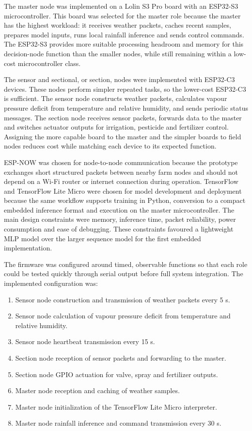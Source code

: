 \documentclass[12pt,a4paper]{report}
\begin{document}
The master node was implemented on a Lolin S3 Pro board with an ESP32-S3 microcontroller. This board was selected for the master role because the master has the highest workload: it receives weather packets, caches recent samples, prepares model inputs, runs local rainfall inference and sends control commands. The ESP32-S3 provides more suitable processing headroom and memory for this decision-node function than the smaller nodes, while still remaining within a low-cost microcontroller class.

The sensor and sectional, or section, nodes were implemented with ESP32-C3 devices. These nodes perform simpler repeated tasks, so the lower-cost ESP32-C3 is sufficient. The sensor node constructs weather packets, calculates vapour pressure deficit from temperature and relative humidity, and sends periodic status messages. The section node receives sensor packets, forwards data to the master and switches actuator outputs for irrigation, pesticide and fertilizer control. Assigning the more capable board to the master and the simpler boards to field nodes reduces cost while matching each device to its expected function.

ESP-NOW was chosen for node-to-node communication because the prototype exchanges short structured packets between nearby farm nodes and should not depend on a Wi-Fi router or internet connection during operation. TensorFlow and TensorFlow Lite Micro were chosen for model development and deployment because the same workflow supports training in Python, conversion to a compact embedded inference format and execution on the master microcontroller. The main design constraints were memory, inference time, packet reliability, power consumption and ease of debugging. These constraints favoured a lightweight MLP model over the larger sequence model for the first embedded implementation.

The firmware was configured around timed, observable functions so that each role could be tested quickly through serial output before full system integration. The implemented configuration was:
\begin{enumerate}[label=(\roman*)]
	\item Sensor node construction and transmission of weather packets every 5 s.
	\item Sensor node calculation of vapour pressure deficit from temperature and relative humidity.
	\item Sensor node heartbeat transmission every 15 s.
	\item Section node reception of sensor packets and forwarding to the master.
	\item Section node GPIO actuation for valve, spray and fertilizer outputs.
	\item Master node reception and caching of weather samples.
	\item Master node initialization of the TensorFlow Lite Micro interpreter.
	\item Master node rainfall inference and command transmission every 30 s.
\end{enumerate}
\end{document}
